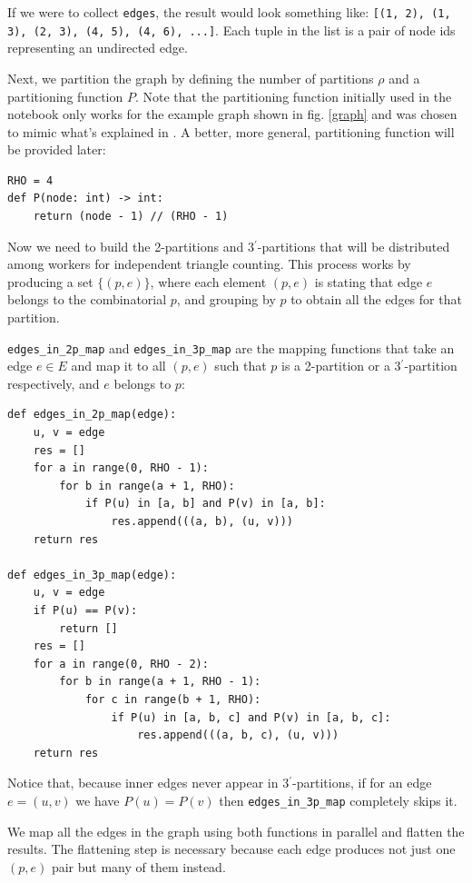 \documentclass[paper=a4, fontsize=11pt]{scrartcl}
\begin{document}
If we were to collect \texttt{edges}, the result would look
something like: \texttt{[(1, 2), (1, 3), (2, 3), (4, 5), (4, 6),
...]}. Each tuple in the list is a pair of node ids representing an undirected
edge.

Next, we partition the graph by defining the number of partitions $\rho$ and a
partitioning function $P$. Note that the partitioning function initially used in
the notebook only works for the example graph shown in fig. \ref{graph} and was
chosen to mimic what's explained in \cite{park2013efficient}. A better, more
general, partitioning function will be provided later:
\begin{verbatim}
RHO = 4
def P(node: int) -> int:
    return (node - 1) // (RHO - 1)
\end{verbatim}

Now we need to build the 2-partitions and 3$^\prime$-partitions that will be
distributed among workers for independent triangle counting. This process works
by producing a set $\{(p,e)\}$, where each element $(p,e)$ is stating that edge
$e$ belongs to the combinatorial $p$, and grouping by $p$ to obtain all the
edges for that partition.

\texttt{edges_in_2p_map} and \texttt{edges_in_3p_map}
are the mapping functions that take an edge $e\in E$ and map it to all $(p,e)$
such that $p$ is a 2-partition or a 3$^\prime$-partition respectively, and $e$
belongs to $p$:
\begin{verbatim}
def edges_in_2p_map(edge):
    u, v = edge
    res = []
    for a in range(0, RHO - 1):
        for b in range(a + 1, RHO):
            if P(u) in [a, b] and P(v) in [a, b]:
                res.append(((a, b), (u, v)))     
    return res

def edges_in_3p_map(edge):
    u, v = edge
    if P(u) == P(v):
        return []
    res = []
    for a in range(0, RHO - 2):
        for b in range(a + 1, RHO - 1):
            for c in range(b + 1, RHO):
                if P(u) in [a, b, c] and P(v) in [a, b, c]:
                    res.append(((a, b, c), (u, v)))
    return res
\end{verbatim}
Notice that, because inner edges never appear in 3$^\prime$-partitions, if for
an edge $e=(u,v)$ we have $P(u)=P(v)$ then \texttt{edges_in_3p_map}
completely skips it.

We map all the edges in the graph using both functions in parallel and flatten
the results. The flattening step is necessary because each edge produces not
just one $(p,e)$ pair but many of them instead.
\end{document}
